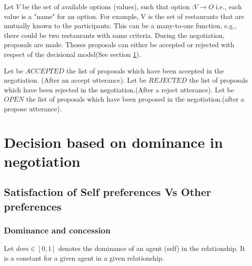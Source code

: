 \documentclass{article}
\begin{document}
		Let $V$ be the set of available options (values), such that option :$ V\rightarrow O$	i.e., each value is a "name" for an option.  For example, V is the set of restaurants that are mutually known to the participants. This can be a many-to-one function, e.g., there could be two restaurants with same criteria. 
		During the negotiation, proposals are made. Thoses proposals can either be accepted or rejected with respect of the decisional model(See section \ref{decision}). 
		
		 
		 Let be $ACCEPTED$ the list of proposals which have been accepted in the negotiation. (After an accept utterance).
		 Let be $REJECTED$ the list of proposals which have been rejected in the negotiation.(After a reject utterance).
		Let be $OPEN$ the list of proposals which have been proposed in the negotiation.(after a propose utterance).
	\section{Decision based on dominance in negotiation}
	\label{decision}
	\subsection{Satisfaction of Self preferences Vs Other preferences}
	
	\subsubsection{Dominance and concession}
	Let  $dom \in [0, 1] $ denotes the dominance of an agent (self) in the 	relationship.  It is a constant for a given agent in a given relationship.
	
\end{document}
